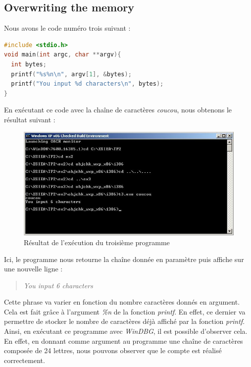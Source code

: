 \subsection{Overwriting the memory}\label{over}
Nous avons le code numéro trois suivant :
\begin{lstlisting}[language=C, caption=Troisième programme]
#include <stdio.h>
void main(int argc, char **argv){
  int bytes;
  printf("%s%n\n", argv[1], &bytes);
  printf("You input %d characters\n", bytes);
}
\end{lstlisting}
En exécutant ce code avec la chaîne de caractères \textit{coucou}, nous obtenons le résultat suivant :
\begin{figure}[H]
  \centering
  \includegraphics[width=.9\textwidth]{img/204.JPG}
  \caption{Résultat de l'exécution du troisième programme}
  \label{img:7}
\end{figure}
Ici, le programme nous retourne la chaîne donnée en paramètre puis affiche sur une nouvelle ligne :
\begin{quotation}
\textit{ You input 6 characters}
\end{quotation} 
Cette phrase va varier en fonction du nombre caractères donnés en argument. Cela est fait grâce à l'argument \textit{\%n} de la fonction \textit{printf}. En effet, ce dernier va permettre de stocker le nombre de caractères déjà affiché par la fonction \textit{printf}.\\
Ainsi, en exécutant ce programme avec \textit{WinDBG}, il est possible d'observer cela. En effet, en donnant comme argument au programme une chaîne de caractères composée de 24 lettres, nous pouvons observer que le compte est réalisé correctement.

